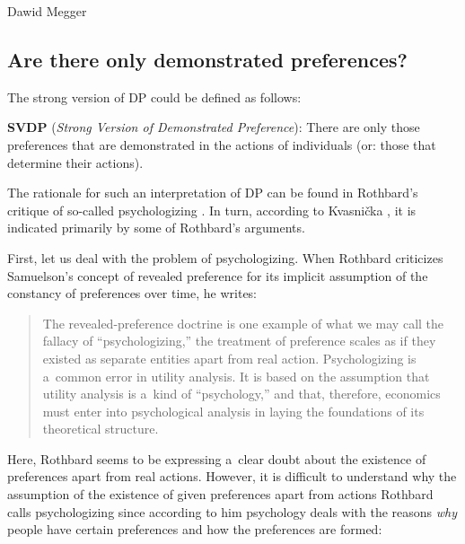 \begin{artengenv}{Dawid Megger}
\subsection{Are there only demonstrated preferences?}



The strong version of DP could be defined as follows:

\medskip

\noindent \textbf{SVDP} (\textit{Strong Version of Demonstrated Preference}): There are only those preferences that are demonstrated in the actions of individuals (or: those that determine their actions).

\medskip

The rationale for such an interpretation of DP can be found in Rothbard's critique of so-called psychologizing 
\parencite[][pp.296–298]{rothbard_present_2011}. %
 In turn, according to Kvasnička 
\parencite*[][]{kvasnicka_rothbards_2008}, %
 it is indicated primarily by some of Rothbard's arguments.



First, let us deal with the problem of psychologizing. When Rothbard criticizes Samuelson's concept of revealed preference for its implicit assumption of the constancy of preferences over time, he writes:



\begin{quote}
The revealed-preference doctrine is one example of what we may call the fallacy of ``psychologizing,'' the treatment of preference scales as if they existed as separate entities apart from real action. Psychologizing is a~common error in utility analysis. It is based on the assumption that utility analysis is a~kind of ``psychology,'' and that, therefore, economics must enter into psychological analysis in laying the foundations of its theoretical structure. 
\parencite[][p.296]{rothbard_present_2011}%
\end{quote}




Here, Rothbard seems to be expressing a~clear doubt about the existence of preferences apart from real actions. However, it is difficult to understand why the assumption of the existence of given preferences apart from actions Rothbard calls psychologizing since according to him psychology deals with the reasons \textit{why} people have certain preferences and how the preferences are formed:




\end{artengenv}

